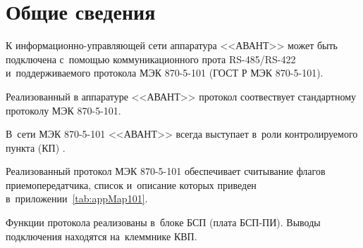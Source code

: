 \section{Общие сведения} \label{sec:overview}

К информационно-управляющей сети аппаратура <<АВАНТ>> может быть подключена с~помощью коммуникационного прота RS-485/RS-422 и~поддерживаемого протокола МЭК 870-5-101 (ГОСТ Р МЭК 870-5-101).  

Реализованный в аппаратуре <<АВАНТ>> протокол соотвествует стандартному протоколу МЭК 870-5-101.

В~сети МЭК 870-5-101 <<АВАНТ>> всегда выступает в~роли контролируемого пункта (КП) .

Реализованный протокол МЭК 870-5-101 обеспечивает считывание флагов приемопередатчика, список и~описание которых приведен в~приложении~\ref{tab:appMap101}.

Функции протокола реализованы в~блоке БСП (плата БСП-ПИ). Выводы подключения находятся на~клеммнике КВП.